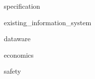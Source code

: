 \documentclass[a4paper,utf8,pointsection]{eskdtext}
\begin{document}






\begin{ESKDtitlePage}\end{ESKDtitlePage}
\tableofcontents
\newpage


{specification}

{existing_information_system}

{dataware}

{economics}

{safety}
\end{document}
